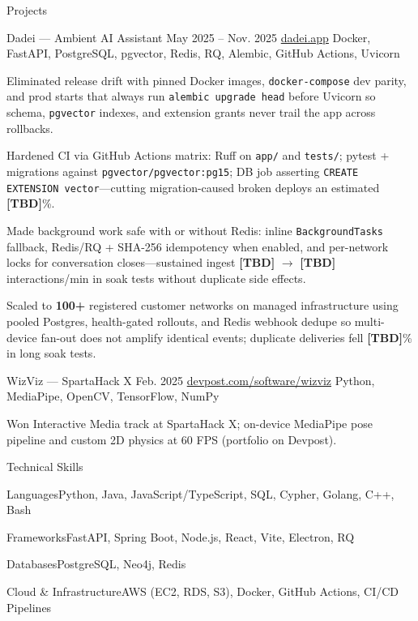 \documentclass[
	11pt
]{../../resume}
\begin{document}
	\begin{rSection}{P}{rojects}
		\begin{rSectionEntry}
			{Dadei --- Ambient AI Assistant}
			{May 2025 -- Nov. 2025}
			{\href{https://dadei.app}{dadei.app}}
			{Docker, FastAPI, PostgreSQL, pgvector, Redis, RQ, Alembic, GitHub Actions, Uvicorn}
			{}

			\item Eliminated release drift with pinned Docker images, \texttt{docker-compose} dev parity, and prod starts that always run \texttt{alembic upgrade head} before Uvicorn so schema, \texttt{pgvector} indexes, and extension grants never trail the app across rollbacks.
			\item Hardened CI via GitHub Actions matrix: Ruff on \texttt{app/} and \texttt{tests/}; pytest + migrations against \texttt{pgvector/pgvector:pg15}; DB job asserting \texttt{CREATE EXTENSION vector}---cutting migration-caused broken deploys an estimated \textbf{[TBD]}\%. %
			\item Made background work safe with or without Redis: inline \texttt{BackgroundTasks} fallback, Redis/RQ + SHA-256 idempotency when enabled, and per-network locks for conversation closes---sustained ingest \textbf{[TBD]} $\rightarrow$ \textbf{[TBD]} interactions/min in soak tests without duplicate side effects. %
			\item Scaled to \textbf{100+} registered customer networks on managed infrastructure using pooled Postgres, health-gated rollouts, and Redis webhook dedupe so multi-device fan-out does not amplify identical events; duplicate deliveries fell \textbf{[TBD]}\% in long soak tests. %
		\end{rSectionEntry}

		\begin{rSectionEntry}
			{WizViz --- SpartaHack X}
			{Feb. 2025}
			{\href{https://devpost.com/software/wizviz}{devpost.com/software/wizviz}}
			{Python, MediaPipe, OpenCV, TensorFlow, NumPy}
			{}

			\item Won Interactive Media track at SpartaHack X; on-device MediaPipe pose pipeline and custom 2D physics at 60 FPS (portfolio on Devpost).
		\end{rSectionEntry}
	\end{rSection}

	\begin{rSection}{T}{echnical Skills}
		\begin{rSet}{Languages}{Python, Java, JavaScript/TypeScript, SQL, Cypher, Golang, C++, Bash}
		\end{rSet}
		\begin{rSet}{Frameworks}{FastAPI, Spring Boot, Node.js, React, Vite, Electron, RQ}
		\end{rSet}
		\begin{rSet}{Databases}{PostgreSQL, Neo4j, Redis}
		\end{rSet}
		\begin{rSet}{Cloud \& Infrastructure}{AWS (EC2, RDS, S3), Docker, GitHub Actions, CI/CD Pipelines}
		\end{rSet}
	\end{rSection}
\end{document}
